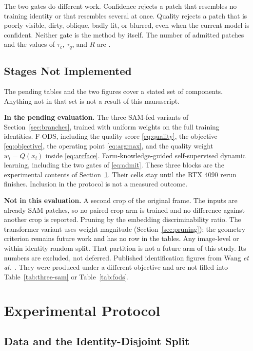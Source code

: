 The two gates do different work. Confidence rejects a patch that resembles no training identity or that resembles several at once. Quality rejects a patch that is poorly visible, dirty, oblique, badly lit, or blurred, even when the current model is confident. Neither gate is the method by itself. The number of admitted patches and the values of $\tau_{c}$, $\tau_{q}$, and $R$ are \pending{}.

\subsection{Stages Not Implemented}
\label{sec:not-implemented}

The pending tables and the two figures cover a stated set of components. Anything not in that set is not a result of this manuscript.

\textbf{In the pending evaluation.}
The three SAM-fed variants of Section~\ref{sec:branches}, trained with uniform weights on the full training identities.
F-ODS, including the quality score \eqref{eq:quality}, the objective \eqref{eq:objective}, the operating point \eqref{eq:argmax}, and the quality weight $w_{i}=Q(x_{i})$ inside \eqref{eq:arcface}.
Farm-knowledge-guided self-supervised dynamic learning, including the two gates of \eqref{eq:admit}.
These three blocks are the experimental contents of Section~\ref{sec:protocol}. Their cells stay \pending{} until the RTX 4090 rerun finishes. Inclusion in the protocol is not a measured outcome.

\textbf{Not in this evaluation.}
A second crop of the original frame. The inputs are already SAM patches, so no paired crop arm is trained and no difference against another crop is reported.
Pruning by the embedding discriminability ratio. The transformer variant uses weight magnitude (Section~\ref{sec:pruning}); the geometry criterion remains future work and has no row in the tables.
Any image-level or within-identity random split. That partition is not a future arm of this study. Its numbers are excluded, not deferred.
Published identification figures from Wang \emph{et al.}~\cite{wang2025coatdml}. They were produced under a different objective and are not filled into Table~\ref{tab:three-sam} or Table~\ref{tab:fods}.

\section{Experimental Protocol}
\label{sec:protocol}

\subsection{Data and the Identity-Disjoint Split}
\label{sec:data-protocol}

